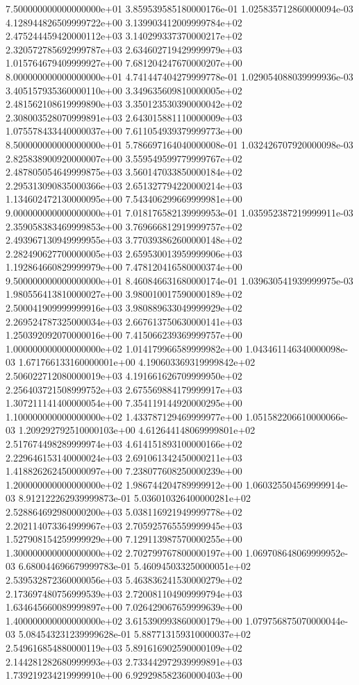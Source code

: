 \documentclass{article}
\begin{document}
\begin{center}
{7.500000000000000000e+01 3.859539585180000176e-01 1.025835712860000094e-03 4.128944826509999722e+00 3.139903412009999784e+02 2.475244459420000112e+03 3.140299337370000217e+02 2.320572785692999787e+03 2.634602719429999979e+03 1.015764679409999927e+00 7.681204247670000207e+00
8.000000000000000000e+01 4.741447404279999778e-01 1.029054088039999936e-03 3.405157935360000110e+00 3.349635609810000005e+02 2.481562108619999890e+03 3.350123530390000042e+02 2.308003528070999891e+03 2.643015881110000009e+03 1.075578433440000037e+00 7.611054939379999773e+00
8.500000000000000000e+01 5.786697164040000008e-01 1.032426707920000098e-03 2.825838900920000007e+00 3.559549599779999767e+02 2.487805054649999875e+03 3.560147033850000184e+02 2.295313090835000366e+03 2.651327794220000214e+03 1.134602472130000095e+00 7.543406299669999981e+00
9.000000000000000000e+01 7.018176582139999953e-01 1.035952387219999911e-03 2.359058383469999853e+00 3.769666812919999757e+02 2.493967130949999955e+03 3.770393862600000148e+02 2.282490627700000005e+03 2.659530013959999906e+03 1.192864660829999979e+00 7.478120416580000374e+00
9.500000000000000000e+01 8.460846631680000174e-01 1.039630541939999975e-03 1.980556413810000027e+00 3.980010017590000189e+02 2.500041909999999916e+03 3.980889633049999929e+02 2.269524787325000034e+03 2.667613750630000141e+03 1.250392092070000016e+00 7.415066239369999757e+00
1.000000000000000000e+02 1.014179966589999982e+00 1.043461146340000098e-03 1.671766133160000001e+00 4.190603369319999842e+02 2.506022712080000019e+03 4.191661626709999950e+02 2.256403721508999752e+03 2.675569884179999917e+03 1.307211141400000054e+00 7.354119144920000295e+00
1.100000000000000000e+02 1.433787129469999977e+00 1.051582206610000066e-03 1.209292792510000103e+00 4.612644148069999801e+02 2.517674498289999974e+03 4.614151893100000166e+02 2.229646153140000024e+03 2.691061342450000211e+03 1.418826262450000097e+00 7.238077608250000239e+00
1.200000000000000000e+02 1.986744204789999912e+00 1.060325504569999914e-03 8.912122262939999873e-01 5.036010326400000281e+02 2.528864692980000200e+03 5.038116921949999778e+02 2.202114073364999967e+03 2.705925765559999945e+03 1.527908154259999929e+00 7.129113987570000255e+00
1.300000000000000000e+02 2.702799767800000197e+00 1.069708648069999952e-03 6.680044696679999783e-01 5.460945033250000051e+02 2.539532872360000056e+03 5.463836241530000279e+02 2.173697480756999539e+03 2.720081104909999794e+03 1.634645660089999897e+00 7.026429067659999639e+00
1.400000000000000000e+02 3.615390993860000179e+00 1.079756875070000044e-03 5.084543231239999628e-01 5.887713159310000037e+02 2.549616854880000119e+03 5.891616902590000109e+02 2.144281282680999993e+03 2.733442972939999891e+03 1.739219234219999910e+00 6.929298582360000403e+00
}
\end{center}
\end{document}
